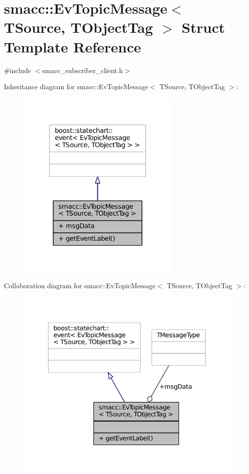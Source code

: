 \hypertarget{structsmacc_1_1EvTopicMessage}{}\section{smacc\+:\+:Ev\+Topic\+Message$<$ T\+Source, T\+Object\+Tag $>$ Struct Template Reference}
\label{structsmacc_1_1EvTopicMessage}


{\ttfamily \#include $<$smacc\+\_\+subscriber\+\_\+client.\+h$>$}



Inheritance diagram for smacc\+:\+:Ev\+Topic\+Message$<$ T\+Source, T\+Object\+Tag $>$\+:
\nopagebreak
\begin{figure}[H]
\begin{center}
\leavevmode
\includegraphics[width=227pt]{structsmacc_1_1EvTopicMessage__inherit__graph}
\end{center}
\end{figure}


Collaboration diagram for smacc\+:\+:Ev\+Topic\+Message$<$ T\+Source, T\+Object\+Tag $>$\+:
\nopagebreak
\begin{figure}[H]
\begin{center}
\leavevmode
\includegraphics[width=332pt]{structsmacc_1_1EvTopicMessage__coll__graph}
\end{center}
\end{figure}
